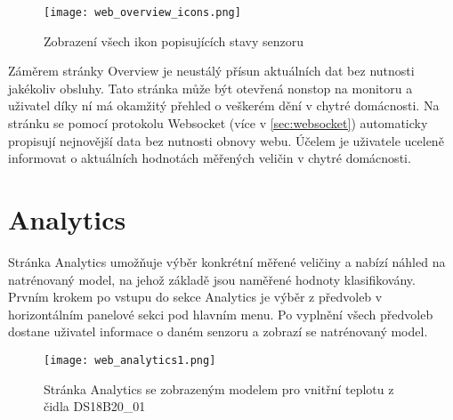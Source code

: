 \begin{figure}[H]
  \centering
  \texttt{[image: web\_overview\_icons.png]}
  \caption{Zobrazení všech ikon popisujících stavy senzoru}
  \label{fig:web_overview_icons}
\end{figure}

Záměrem stránky Overview je neustálý přísun aktuálních dat bez nutnosti jakékoliv obsluhy. Tato stránka může být otevřená nonstop na monitoru a uživatel díky ní má okamžitý přehled o veškerém dění v chytré domácnosti. Na stránku se pomocí protokolu Websocket (více v \cref{sec:websocket}) automaticky propisují nejnovější data bez nutnosti obnovy webu. Účelem je uživatele uceleně informovat o aktuálních hodnotách měřených veličin v chytré domácnosti.

\section{Analytics} \label{sec:analytics}

Stránka Analytics umožňuje výběr konkrétní měřené veličiny a nabízí náhled na natrénovaný model, na jehož základě jsou naměřené hodnoty klasifikovány. Prvním krokem po vstupu do sekce Analytics je výběr z předvoleb v horizontálním panelové sekci pod hlavním menu. Po vyplnění všech předvoleb dostane uživatel informace o daném senzoru a zobrazí se natrénovaný model.

\begin{figure}[H]
  \centering
  \texttt{[image: web\_analytics1.png]}
  \caption{Stránka Analytics se zobrazeným modelem pro vnitřní teplotu z čidla DS18B20\_01}
  \label{fig:web_analytics1}
\end{figure}

